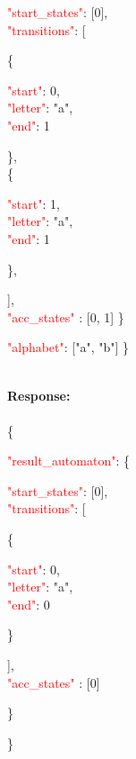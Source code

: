      \begin{adjustwidth}{7.5 mm}{0 cm}
     \begin{adjustwidth}{7.5 mm}{0 cm}
            \textcolor{red}{"start\_states"}: [0],\\
            \textcolor{red}{"transitions"}: [
            \begin{adjustwidth}{7.5 mm}{0 cm}
            \{
               \begin{adjustwidth}{7.5 mm}{0 cm}
                    \textcolor{red}{"start"}: 0,\\
                    \textcolor{red}{"letter"}: "a",\\
                    \textcolor{red}{"end"}: 1
               \end{adjustwidth}
            \}, \\
            \{
               \begin{adjustwidth}{7.5 mm}{0 cm}
                    \textcolor{red}{"start"}: 1,\\
                    \textcolor{red}{"letter"}: "a",\\
                    \textcolor{red}{"end"}: 1
               \end{adjustwidth}
            \},
            \end{adjustwidth}
            ],\\
        \textcolor{red}{"acc\_states" }: [0, 1]  \}
    \end{adjustwidth}
    \end{adjustwidth}
   \begin{adjustwidth}{7.5 mm}{0 cm}
    \textcolor{red}{"alphabet"}: ["a", "b"] \}
    \end{adjustwidth}
\ \\
\textbf{Response:}\\
\ \\
\{
 \begin{adjustwidth}{7.5 mm}{0 cm}
    \textcolor{red}{"result\_automaton"}: \{
        \begin{adjustwidth}{7.5 mm}{0 cm}
            \textcolor{red}{"start\_states"}: [0],\\
            \textcolor{red}{"transitions"}: [
            \begin{adjustwidth}{7.5 mm}{0 cm}
            \{
               \begin{adjustwidth}{7.5 mm}{0 cm}
                    \textcolor{red}{"start"}: 0,\\
                    \textcolor{red}{"letter"}: "a",\\
                    \textcolor{red}{"end"}: 0
               \end{adjustwidth}
            \}
            \end{adjustwidth}
            ],\\
        \textcolor{red}{"acc\_states" }: [0]
    \end{adjustwidth}
    \}
\end{adjustwidth}
\}




